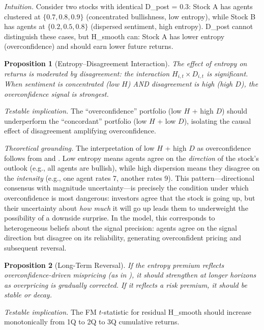 \documentclass[12pt,a4paper]{article}
\newtheorem{proposition}{Proposition}
\begin{document}
\noindent\textit{Intuition.} Consider two stocks with identical D\_post = 0.3: Stock A has agents clustered at $\{0.7, 0.8, 0.9\}$ (concentrated bullishness, low entropy), while Stock B has agents at $\{0.2, 0.5, 0.8\}$ (dispersed sentiment, high entropy). D\_post cannot distinguish these cases, but H\_smooth can: Stock A has lower entropy (overconfidence) and should earn lower future returns.

\begin{proposition}[Entropy--Disagreement Interaction]\label{prop:interaction}
The effect of entropy on returns is moderated by disagreement: the interaction $H_{i,t} \times D_{i,t}$ is significant. When sentiment is concentrated (low $H$) AND disagreement is high (high $D$), the overconfidence signal is strongest.
\end{proposition}

\noindent\textit{Testable implication.} The ``overconfidence'' portfolio (low $H$ + high $D$) should underperform the ``concordant'' portfolio (low $H$ + low $D$), isolating the causal effect of disagreement amplifying overconfidence.

\noindent\textit{Theoretical grounding.} The interpretation of low $H$ + high $D$ as overconfidence follows from \citet{Daniel1998} and \citet{Scheinkman2003}. Low entropy means agents agree on the \textit{direction} of the stock's outlook (e.g., all agents are bullish), while high dispersion means they disagree on the \textit{intensity} (e.g., one agent rates 7, another rates 9). This pattern---directional consensus with magnitude uncertainty---is precisely the condition under which overconfidence is most dangerous: investors agree that the stock is going up, but their uncertainty about \textit{how much} it will go up leads them to underweight the possibility of a downside surprise. In the \citet{Scheinkman2003} model, this corresponds to heterogeneous beliefs about the signal precision: agents agree on the signal direction but disagree on its reliability, generating overconfident pricing and subsequent reversal.

\begin{proposition}[Long-Term Reversal]\label{prop:reversal}
If the entropy premium reflects overconfidence-driven mispricing (as in \citealt{Daniel1998}), it should strengthen at longer horizons as overpricing is gradually corrected. If it reflects a risk premium, it should be stable or decay.
\end{proposition}

\noindent\textit{Testable implication.} The FM $t$-statistic for residual H\_smooth should increase monotonically from 1Q to 2Q to 3Q cumulative returns.
\end{document}
